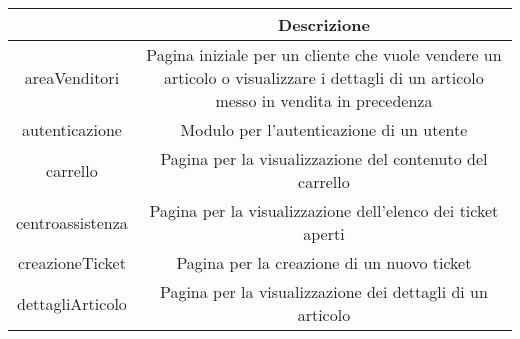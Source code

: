 \documentclass[12pt,a4paper]{article}
\begin{document}
\begin{center}
\begin{tabular}{|c|c|}
\hline
\rowcolor[HTML]{C0C0C0} 
\rowcolor[HTML]{C0C0C0}  \multicolumn{1}{|c|}{\cellcolor[HTML]{C0C0C0}File}  &  Descrizione \\ \hline

areaVenditori & \begin{minipage}{10cm} \vspace{5pt}
Pagina iniziale per un cliente che vuole vendere un articolo o visualizzare i dettagli di un articolo messo in vendita in precedenza \vspace{5pt}
\end{minipage} \\ \hline

autenticazione & \begin{minipage}{10cm} \vspace{5pt}
Modulo per l'autenticazione di un utente \vspace{5pt}
\end{minipage} \\ \hline

carrello & \begin{minipage}{10cm} \vspace{5pt}
Pagina per la visualizzazione del contenuto del carrello \vspace{5pt}
\end{minipage} \\ \hline

centroassistenza & \begin{minipage}{10cm} \vspace{5pt}
Pagina per la visualizzazione dell'elenco dei ticket aperti \vspace{5pt}
\end{minipage} \\ \hline

creazioneTicket & \begin{minipage}{10cm} \vspace{5pt}
Pagina per la creazione di un nuovo ticket \vspace{5pt}
\end{minipage} \\ \hline

dettagliArticolo & \begin{minipage}{10cm} \vspace{5pt}
Pagina per la visualizzazione dei dettagli di un articolo \vspace{5pt}
\end{minipage} \\ \hline


\end{tabular}
\end{center}
\end{document}

